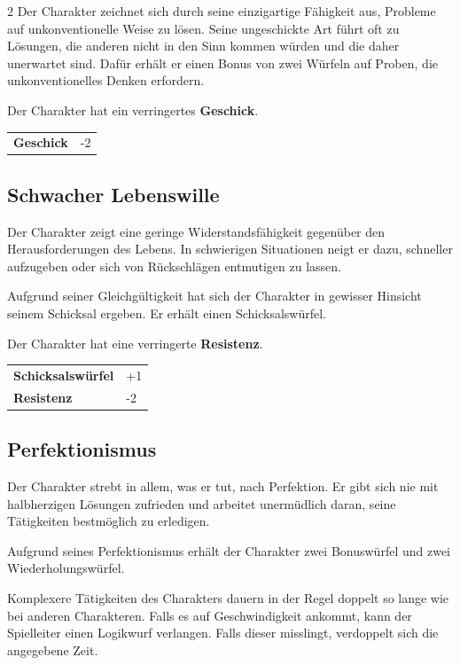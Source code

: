 \begin{multicols}{2}
    Der Charakter zeichnet sich durch seine einzigartige Fähigkeit aus, Probleme auf unkonventionelle Weise zu lösen. Seine ungeschickte Art führt oft zu Lösungen, die anderen nicht in den Sinn kommen würden und die daher unerwartet sind. Dafür erhält er einen Bonus von zwei Würfeln auf Proben, die unkonventionelles Denken erfordern.

    Der Charakter hat ein verringertes \textbf{Geschick}.

    \begin{tabular}{@{}ll@{}}
        \textbf{Geschick} & -2\\
    \end{tabular}

    \subsection*{Schwacher Lebenswille}

    Der Charakter zeigt eine geringe Widerstandsfähigkeit gegenüber den Herausforderungen des Lebens. In schwierigen Situationen neigt er dazu, schneller aufzugeben oder sich von Rückschlägen entmutigen zu lassen.

    Aufgrund seiner Gleichgültigkeit hat sich der Charakter in gewisser Hinsicht seinem Schicksal ergeben. Er erhält einen Schicksalswürfel.

    Der Charakter hat eine verringerte \textbf{Resistenz}.

    \begin{tabular}{@{}ll@{}}
        \textbf{Schicksalswürfel} & +1\\
        \textbf{Resistenz} & -2\\
    \end{tabular}

    \subsection*{Perfektionismus}

    Der Charakter strebt in allem, was er tut, nach Perfektion. Er gibt sich nie mit halbherzigen Lösungen zufrieden und arbeitet unermüdlich daran, seine Tätigkeiten bestmöglich zu erledigen.

    Aufgrund seines Perfektionismus erhält der Charakter zwei Bonuswürfel und zwei Wiederholungswürfel.

    Komplexere Tätigkeiten des Charakters dauern in der Regel doppelt so lange wie bei anderen Charakteren. Falls es auf Geschwindigkeit ankommt, kann der Spielleiter einen Logikwurf verlangen. Falls dieser misslingt, verdoppelt sich die angegebene Zeit.


\end{multicols}
